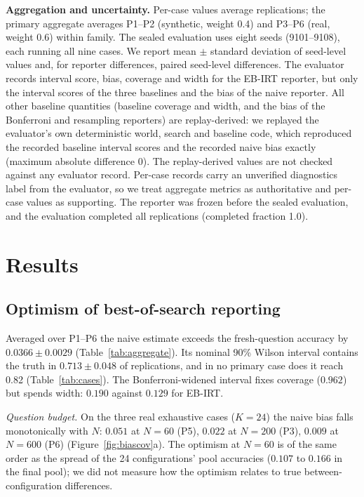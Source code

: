 \documentclass{article}
\begin{document}
\textbf{Aggregation and uncertainty.} Per-case values average replications; the primary aggregate averages P1--P2 (synthetic, weight 0.4) and P3--P6 (real, weight 0.6) within family. The sealed evaluation uses eight seeds (9101--9108), each running all nine cases. We report mean $\pm$ standard deviation of seed-level values and, for reporter differences, paired seed-level differences. The evaluator records interval score, bias, coverage and width for the EB-IRT reporter, but only the interval scores of the three baselines and the bias of the naive reporter. All other baseline quantities (baseline coverage and width, and the bias of the Bonferroni and resampling reporters) are replay-derived: we replayed the evaluator's own deterministic world, search and baseline code, which reproduced the recorded baseline interval scores and the recorded naive bias exactly (maximum absolute difference 0). The replay-derived values are not checked against any evaluator record. Per-case records carry an unverified diagnostics label from the evaluator, so we treat aggregate metrics as authoritative and per-case values as supporting. The reporter was frozen before the sealed evaluation, and the evaluation completed all replications (completed fraction 1.0).

\section{Results}\label{sec:results}
\subsection{Optimism of best-of-search reporting}\label{sec:gap}
Averaged over P1--P6 the naive estimate exceeds the fresh-question accuracy by $0.0366\pm0.0029$ (Table~\ref{tab:aggregate}). Its nominal 90\% Wilson interval contains the truth in $0.713\pm0.048$ of replications, and in no primary case does it reach 0.82 (Table~\ref{tab:cases}). The Bonferroni-widened interval fixes coverage ($0.962$) but spends width: $0.190$ against $0.129$ for EB-IRT.

\emph{Question budget.} On the three real exhaustive cases ($K=24$) the naive bias falls monotonically with $N$: $0.051$ at $N=60$ (P5), $0.022$ at $N=200$ (P3), $0.009$ at $N=600$ (P6) (Figure~\ref{fig:biascov}a). The optimism at $N=60$ is of the same order as the spread of the 24 configurations' pool accuracies ($0.107$ to $0.166$ in the final pool); we did not measure how the optimism relates to true between-configuration differences.
\end{document}
